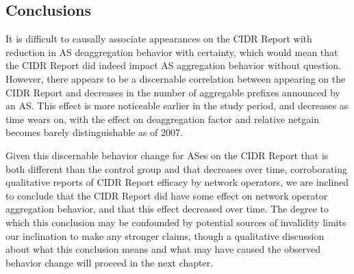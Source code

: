 %
%
%
%
%
%


\subsection{Conclusions}

It is difficult to causally associate appearances on the CIDR Report with
reduction in AS deaggregation behavior with certainty, which would mean that
the CIDR Report did indeed impact AS aggregation behavior without question.
However, there appears to be a discernable correlation between appearing on the
CIDR Report and decreases in the number of aggregable prefixes announced by an
AS.  This effect is more noticeable earlier in the study period, and decreases
as time wears on, with the effect on deaggregation
factor and relative netgain becomes barely distinguishable as of 2007.

Given this discernable behavior change for ASes on the CIDR Report that is
both different than the control group and that decreases over time,
corroborating qualitative reports of CIDR Report efficacy by network
operators, we are inclined to conclude that the CIDR Report did have some effect
on network operator aggregation behavior, and that this effect decreased over
time. The degree to which this conclusion may be confounded by potential
sources of invalidity limits our inclination to make any stronger claims, though
a qualitative discussion about what this conclusion means and what may have
caused the observed behavior change will proceed in the next chapter.


